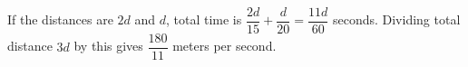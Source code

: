 If the distances are $2d$ and $d$, total time is $\dfrac{2d}{15}+\dfrac{d}{20}=\dfrac{11d}{60}$ seconds. Dividing total distance $3d$ by this gives $\boxed{\dfrac{180}{11}}$ meters per second.
